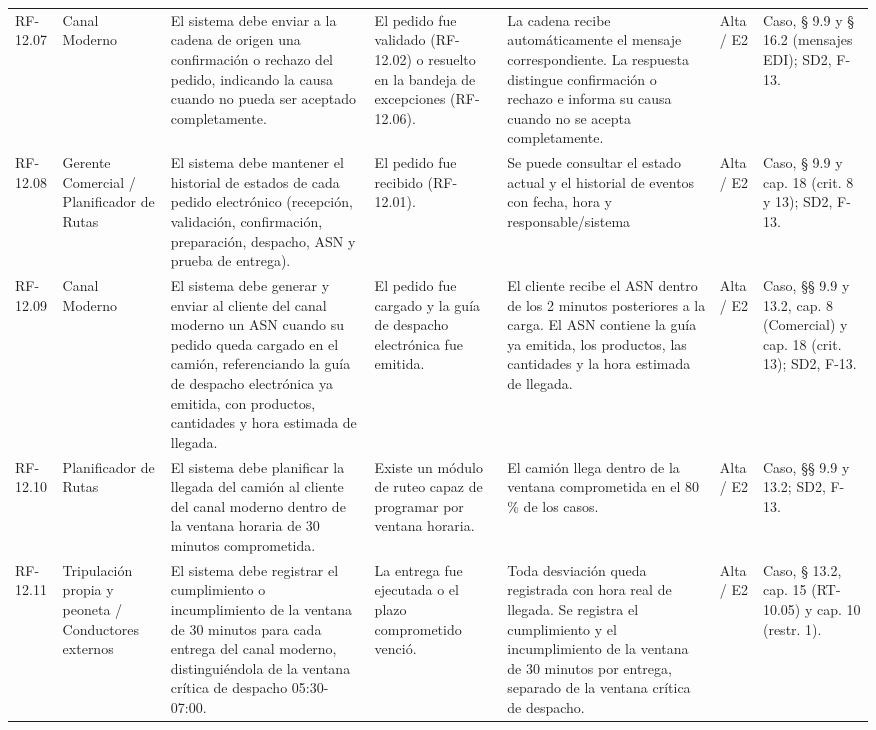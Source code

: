 {\begin{longtable}{@{}F{0.062} F{0.080} F{0.195} F{0.160} F{0.240} F{0.093} F{0.170}@{}}
  RF-12.07 & Canal Moderno & El sistema debe enviar a la cadena de origen una confirmación o rechazo del pedido, indicando la causa cuando no pueda ser aceptado completamente. & El pedido fue validado (RF-12.02) o resuelto en la bandeja de excepciones (RF-12.06). & La cadena recibe automáticamente el mensaje correspondiente. La respuesta distingue confirmación o rechazo e informa su causa cuando no se acepta completamente. & Alta / E2 & Caso, § 9.9 y § 16.2 (mensajes EDI); SD2, F-13. \\
  RF-12.08 & Gerente Comercial / Planificador de Rutas & El sistema debe mantener el historial de estados de cada pedido electrónico (recepción, validación, confirmación, preparación, despacho, ASN y prueba de entrega). & El pedido fue recibido (RF-12.01). & Se puede consultar el estado actual y el historial de eventos con fecha, hora y responsable/sistema & Alta / E2 & Caso, § 9.9 y cap. 18 (crit. 8 y 13); SD2, F-13. \\
  RF-12.09 & Canal Moderno & El sistema debe generar y enviar al cliente del canal moderno un ASN cuando su pedido queda cargado en el camión, referenciando la guía de despacho electrónica ya emitida, con productos, cantidades y hora estimada de llegada. & El pedido fue cargado y la guía de despacho electrónica fue emitida. & El cliente recibe el ASN dentro de los 2 minutos posteriores a la carga. El ASN contiene la guía ya emitida, los productos, las cantidades y la hora estimada de llegada. & Alta / E2 & Caso, §§ 9.9 y 13.2, cap. 8 (Comercial) y cap. 18 (crit. 13); SD2, F-13. \\
  RF-12.10 & Planificador de Rutas & El sistema debe planificar la llegada del camión al cliente del canal moderno dentro de la ventana horaria de 30 minutos comprometida. & Existe un módulo de ruteo capaz de programar por ventana horaria. & El camión llega dentro de la ventana comprometida en el 80 \% de los casos. & Alta / E2 & Caso, §§ 9.9 y 13.2; SD2, F-13. \\
  RF-12.11 & Tripulación propia y peoneta / Conductores externos & El sistema debe registrar el cumplimiento o incumplimiento de la ventana de 30 minutos para cada entrega del canal moderno, distinguiéndola de la ventana crítica de despacho 05:30-07:00. & La entrega fue ejecutada o el plazo comprometido venció. & Toda desviación queda registrada con hora real de llegada. Se registra el cumplimiento y el incumplimiento de la ventana de 30 minutos por entrega, separado de la ventana crítica de despacho. & Alta / E2 & Caso, § 13.2, cap. 15 (RT-10.05) y cap. 10 (restr. 1). \\

\end{longtable}}
